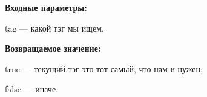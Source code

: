 \textbf{Входные параметры:}

tag --- какой тэг мы ищем.

\textbf{Возвращаемое значение:}

 
    true --- текущий тэг это тот самый, что нам и нужен;
 
    false --- иначе.